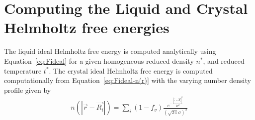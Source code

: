 \documentclass[double,12pt]{beavtex}
\begin{document}
\section{Computing the Liquid and Crystal Helmholtz free energies}

The liquid ideal Helmholtz free energy is computed analytically 
using Equation~\ref{eq:Fideal} 
for a given homogeneous reduced density $n^*$, and reduced temperature $t^*$. 
The crystal ideal Helmholtz free energy is computed computationally 
from Equation~\ref{eq:Fideal-n(r)} with the varying number density profile given by
\begin{align}
  n(|\vec{r}-\vec{R_i}|)=\sum_i{(1-f_v)\frac{e^{-\frac{{|\vec{r}-\vec{R_i}|}^2}{2{\sigma}^2}}}{\left(\sqrt{2\pi}\sigma\right)^3}}
\end{align}
\end{document}
